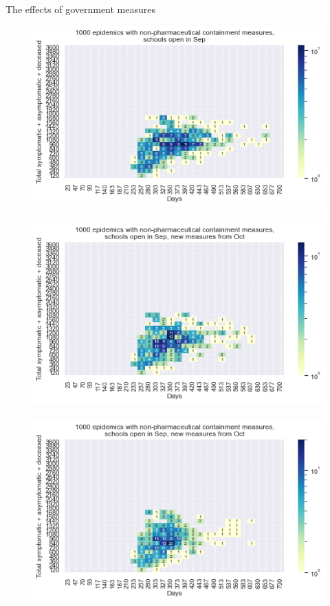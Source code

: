 \documentclass[8pt]{beamer}
\begin{document}
\begin{frame}{The effects of government measures}

\begin{figure}[H]
\center
\includegraphics[scale=0.22]{cp3endA.png}~\includegraphics[scale=0.22]{cp3endB.png}~\includegraphics[scale=0.22]{cp3endC.png}


\end{figure}
\end{frame}
\end{document}
